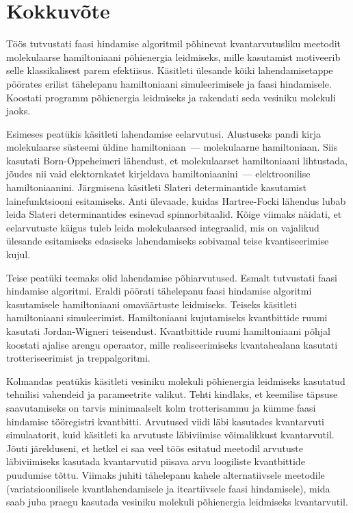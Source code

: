 \documentclass[12pt]{report}
\begin{document}
\chapter{Kokkuvõte}

Töös tutvustati faasi hindamise algoritmil põhinevat kvantarvutusliku meetodit molekulaarse hamiltoniaani põhienergia leidmiseks, mille kasutamist motiveerib selle klassikalisest parem efektiisus.
Käsitleti ülesande kõiki lahendamisetappe pöörates erilist tähelepanu hamiltoniaani simuleerimisele ja faasi hindamisele.
Koostati programm põhienergia leidmiseks ja rakendati seda vesiniku molekuli jaoks.

Esimeses peatükis käsitleti lahendamise eelarvutusi.
Alustuseks pandi kirja molekulaarse süsteemi üldine hamiltoniaan~--- molekulaarne hamiltoniaan.
Siis kasutati Born-Oppeheimeri lähendust, et molekulaarset hamiltoniaani lihtustada, jõudes nii vaid elektornkatet kirjeldava hamiltoniaanini~--- elektroonilise hamiltoniaanini.
Järgmisena käsitleti Slateri determinantide kasutamist lainefunktsiooni esitamiseks.
Anti ülevaade, kuidas Hartree-Focki lähendus lubab leida Slateri determinantides esinevad spinnorbitaalid.
Kõige viimaks näidati, et eelarvutuste käigus tuleb leida molekulaarsed integraalid, mis on vajalikud ülesande esitamiseks edasiseks lahendamiseks sobivamal teise kvantiseerimise kujul.

Teise peatüki teemaks olid lahendamise põhiarvutused.
Esmalt tutvustati faasi hindamise algoritmi.
Eraldi pöörati tähelepanu faasi hindamise algoritmi kasutamisele hamiltoniaani omaväärtuste leidmiseks.
Teiseks käsitleti hamiltoniaani simuleerimist.
Hamiltoniaani kujutamiseks kvantbittide ruumi kasutati Jordan-Wigneri teisendust.
Kvantbittide ruumi hamiltoniaani põhjal koostati ajalise arengu operaator, mille realiseerimiseks kvantahealana kasutati trotteriseerimist ja treppalgoritmi.

Kolmandas peatükis käsitleti vesiniku molekuli põhienergia leidmiseks kasutatud tehnilisi vahendeid ja parameetrite valikut.
Tehti kindlaks, et keemilise täpsuse saavutamiseks on tarvis minimaalselt kolm trotterisammu ja kümme faasi hindamise tööregistri kvantbitti.
Arvutused viidi läbi kasutades kvantarvuti simulaatorit, kuid käsitleti ka arvutuste läbiviimise võimalikkust kvantarvutil.
Jõuti järelduseni, et hetkel ei saa veel töös esitatud meetodil arvutuste läbiviimiseks kasutada kvantarvutid piisava arvu loogiliste kvantbittide puudumise tõttu.
Viimaks juhiti tähelepanu kahele alternatiivsele meetodile (variatsioonilisele kvantlahendamisele ja iteartiivsele faasi hindamisele), mida saab juba praegu kasutada vesiniku molekuli põhienergia leidmiseks kvantarvutil.

\printbibliography[heading=bibintoc, title=Kirjandus]
\end{document}
